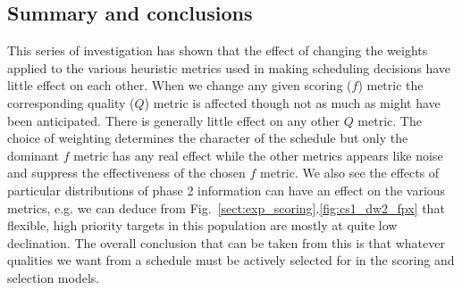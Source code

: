 \subsection{Summary and conclusions}
 This series of investigation has shown that the effect of changing the weights applied to the various heuristic metrics used in making scheduling decisions have little effect on each other. When we change any given scoring ($f$) metric the corresponding quality ($Q$) metric is affected though not as much as might have been anticipated. There is generally little effect on any other $Q$ metric. The choice of weighting determines the character of the schedule but only the dominant $f$ metric has any real effect while the other metrics appears like noise and suppress the effectiveness of the chosen $f$ metric. We also see the effects of particular distributions of phase 2 information can have an effect on the various metrics, e.g. we can deduce from Fig.~\ref{sect:exp_scoring}.\ref{fig:cs1_dw2_fpx} that flexible, high priority targets in this population are mostly at quite low declination. The overall conclusion that can be taken from this is that whatever qualities we want from a schedule must be actively selected for in the scoring and selection models. 
